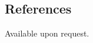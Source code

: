 \documentclass[11pt,letterpaper]{article}
\begin{document}
\subsection*{References}\label{referee}
Available upon request.


%
%
\end{document}

